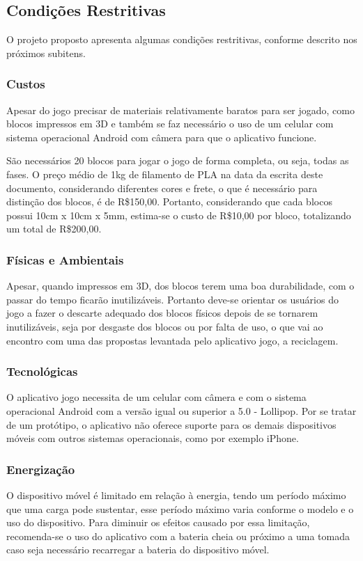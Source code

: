     \subsection{Condições Restritivas}
    O projeto proposto apresenta algumas condições restritivas, conforme descrito nos próximos subitens.

        \subsubsection{Custos}
        Apesar do jogo precisar de materiais relativamente baratos para ser jogado, como blocos impressos em 3D e também se faz necessário o uso de um celular com sistema operacional Android com câmera para que o aplicativo funcione. 
        
        São necessários 20 blocos para jogar o jogo de forma completa, ou seja, todas as fases. O preço médio de 1kg de filamento de PLA na data da escrita deste documento, considerando diferentes cores e frete, o que é necessário para distinção dos blocos, é de R\$150,00. Portanto, considerando que cada blocos possui 10cm x 10cm x 5mm, estima-se o custo de R\$10,00 por bloco, totalizando um total de R\$200,00.
            
        \subsubsection{Físicas e Ambientais}
        Apesar, quando impressos em 3D, dos blocos terem uma boa durabilidade, com o passar do tempo ficarão inutilizáveis. Portanto deve-se orientar os usuários do jogo a fazer o descarte adequado dos blocos físicos depois de se tornarem inutilizáveis, seja por desgaste dos blocos ou por falta de uso, o que vai ao encontro com uma das propostas levantada pelo aplicativo jogo, a reciclagem.
        
        \subsubsection{Tecnológicas}
        O aplicativo jogo necessita de um celular com câmera e com o sistema operacional Android com a versão igual ou superior a 5.0 - Lollipop. Por se tratar de um protótipo, o aplicativo não oferece suporte para os demais dispositivos móveis com outros sistemas operacionais, como por exemplo iPhone. 
        
        \subsubsection{Energização}
        O dispositivo móvel é limitado em relação à energia, tendo um período máximo que uma carga pode sustentar, esse período máximo varia conforme o modelo e o uso do dispositivo. Para diminuir os efeitos causado por essa limitação, recomenda-se o uso do aplicativo com a bateria cheia ou próximo a uma tomada caso seja necessário recarregar a bateria do dispositivo móvel.    
        

